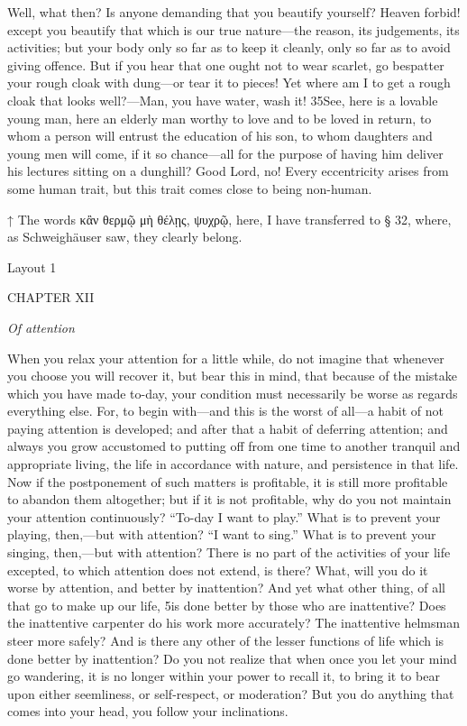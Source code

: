 Well, what then? Is anyone demanding that you beautify yourself? Heaven forbid! except you beautify that which is our true nature—the reason, its judgements, its activities; but your body only so far as to keep it cleanly, only so far as to avoid giving offence. But if you hear that one ought not to wear scarlet, go bespatter your rough cloak with dung—or tear it to pieces! Yet where am I to get a rough cloak that looks well?—Man, you have water, wash it! 35See, here is a lovable young man, here an elderly man worthy to love and to be loved in return, to whom a person will entrust the education of his son, to whom daughters and young men will come, if it so chance—all for the purpose of having him deliver his lectures sitting on a dunghill? Good Lord, no! Every eccentricity arises from some human trait, but this trait comes close to being non-human.



↑ The words κἂν θερμῷ μὴ θέλῃς, ψυχρῷ, here, I have transferred to § 32, where, as Schweighäuser saw, they clearly belong.


Layout 1

CHAPTER XII

\emph{Of attention}

When you relax your attention for a little while, do not imagine that whenever you choose you will recover it, but bear this in mind, that because of the mistake which you have made to-day, your condition must necessarily be worse as regards everything else. For, to begin with—and this is the worst of all—a habit of not paying attention is developed; and after that a habit of deferring attention; and always you grow accustomed to putting off from one time to another tranquil and appropriate living, the life in accordance with nature, and persistence in that life. Now if the postponement of such matters is profitable, it is still more profitable to abandon them altogether; but if it is not profitable, why do you not maintain your attention continuously? ``To-day I want to play.'' What is to prevent your playing, then,—but with attention? ``I want to sing.'' What is to prevent your singing, then,—but with attention? There is no part of the activities of your life excepted, to which attention does not extend, is there? What, will you do it worse by attention, and better by inattention? And yet what other thing, of all that go to make up our life, 5is done better by those who are inattentive? Does the inattentive carpenter do his work more accurately? The inattentive helmsman steer more safely? And is there any other of the lesser functions of life which is done better by inattention? Do you not realize that when once you let your mind go wandering, it is no longer within your power to recall it, to bring it to bear upon either seemliness, or self-respect, or moderation? But you do anything that comes into your head, you follow your inclinations.


